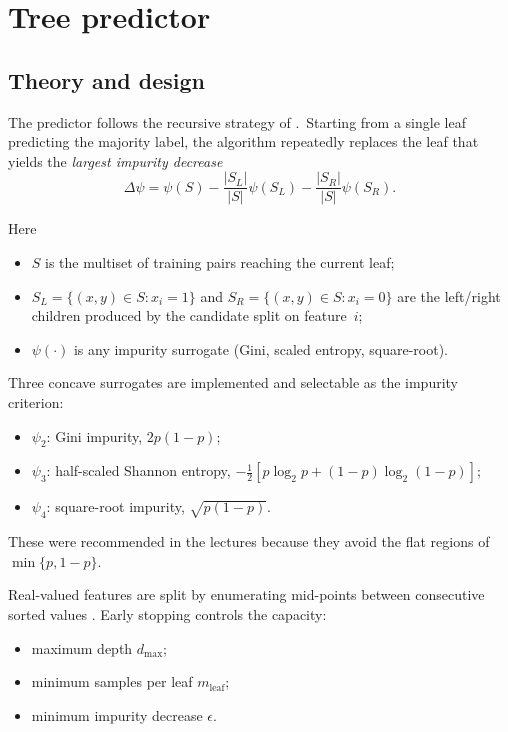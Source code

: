 \documentclass[12pt]{report}
\begin{document}
\section{Tree predictor}

\subsection{Theory and design}
The predictor follows the recursive strategy of \citet[pp.\,253-254]{shalev}.\
Starting from a single leaf predicting the majority label, the algorithm repeatedly
replaces the leaf that yields the \emph{largest impurity decrease}
\[
  \Delta\psi
  =\psi(S)
  -\frac{|S_L|}{|S|}\psi(S_L)
  -\frac{|S_R|}{|S|}\psi(S_R).
\]

Here  

\begin{itemize}
  \item \(S\) is the multiset of training pairs reaching the current leaf;
  \item \(S_L=\{(x,y)\!\in\!S : x_i=1\}\) and
        \(S_R=\{(x,y)\!\in\!S : x_i=0\}\) are the left/right children
        produced by the candidate split on feature~\(i\);
  \item \(\psi(\cdot)\) is any impurity surrogate
        (Gini, scaled entropy, square-root).
\end{itemize}

Three concave surrogates are implemented and selectable as the impurity criterion:
\begin{itemize}
  \item $\psi_2$: Gini impurity, $2p(1-p)$;
  \item $\psi_3$: half-scaled Shannon entropy, $-\tfrac{1}{2}[p \log_2 p + (1-p)\log_2(1-p)]$;
  \item $\psi_4$: square-root impurity, $\sqrt{p(1-p)}$.
\end{itemize}

These were recommended in the lectures because they avoid the flat regions of
$\min\{p,1-p\}$.

Real-valued features are split by enumerating mid-points between consecutive sorted
values \citep[p.\,255]{shalev}.  Early stopping controls the capacity:

\begin{itemize}
  \item maximum depth $d_{\max}$;
  \item minimum samples per leaf $m_{\text{leaf}}$;
  \item minimum impurity decrease $\epsilon$.
\end{itemize}
\end{document}
